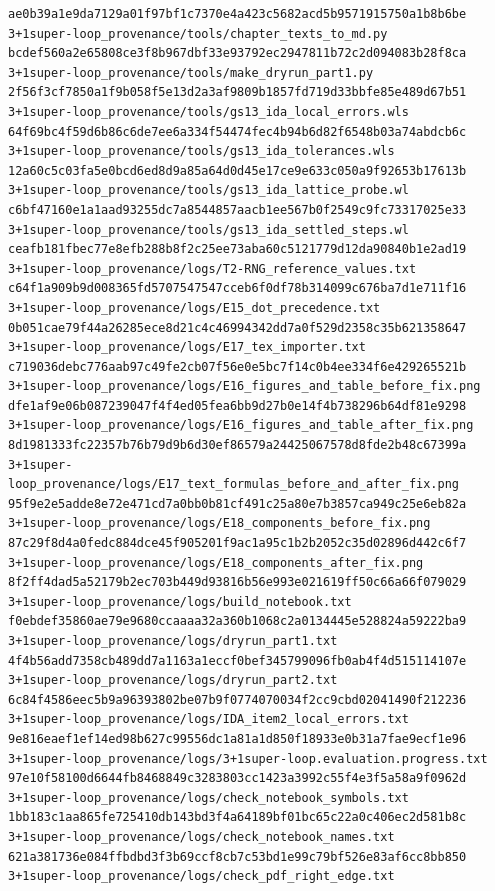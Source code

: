 \documentclass[
  10pt,
]{article}
\begin{document}
\begin{verbatim}
ae0b39a1e9da7129a01f97bf1c7370e4a423c5682acd5b9571915750a1b8b6be  3+1super-loop_provenance/tools/chapter_texts_to_md.py
bcdef560a2e65808ce3f8b967dbf33e93792ec2947811b72c2d094083b28f8ca  3+1super-loop_provenance/tools/make_dryrun_part1.py
2f56f3cf7850a1f9b058f5e13d2a3af9809b1857fd719d33bbfe85e489d67b51  3+1super-loop_provenance/tools/gs13_ida_local_errors.wls
64f69bc4f59d6b86c6de7ee6a334f54474fec4b94b6d82f6548b03a74abdcb6c  3+1super-loop_provenance/tools/gs13_ida_tolerances.wls
12a60c5c03fa5e0bcd6ed8d9a85a64d0d45e17ce9e633c050a9f92653b17613b  3+1super-loop_provenance/tools/gs13_ida_lattice_probe.wl
c6bf47160e1a1aad93255dc7a8544857aacb1ee567b0f2549c9fc73317025e33  3+1super-loop_provenance/tools/gs13_ida_settled_steps.wl
ceafb181fbec77e8efb288b8f2c25ee73aba60c5121779d12da90840b1e2ad19  3+1super-loop_provenance/logs/T2-RNG_reference_values.txt
c64f1a909b9d008365fd5707547547cceb6f0df78b314099c676ba7d1e711f16  3+1super-loop_provenance/logs/E15_dot_precedence.txt
0b051cae79f44a26285ece8d21c4c46994342dd7a0f529d2358c35b621358647  3+1super-loop_provenance/logs/E17_tex_importer.txt
c719036debc776aab97c49fe2cb07f56e0e5bc7f14c0b4ee334f6e429265521b  3+1super-loop_provenance/logs/E16_figures_and_table_before_fix.png
dfe1af9e06b087239047f4f4ed05fea6bb9d27b0e14f4b738296b64df81e9298  3+1super-loop_provenance/logs/E16_figures_and_table_after_fix.png
8d1981333fc22357b76b79d9b6d30ef86579a24425067578d8fde2b48c67399a  3+1super-loop_provenance/logs/E17_text_formulas_before_and_after_fix.png
95f9e2e5adde8e72e471cd7a0bb0b81cf491c25a80e7b3857ca949c25e6eb82a  3+1super-loop_provenance/logs/E18_components_before_fix.png
87c29f8d4a0fedc884dce45f905201f9ac1a95c1b2b2052c35d02896d442c6f7  3+1super-loop_provenance/logs/E18_components_after_fix.png
8f2ff4dad5a52179b2ec703b449d93816b56e993e021619ff50c66a66f079029  3+1super-loop_provenance/logs/build_notebook.txt
f0ebdef35860ae79e9680ccaaaa32a360b1068c2a0134445e528824a59222ba9  3+1super-loop_provenance/logs/dryrun_part1.txt
4f4b56add7358cb489dd7a1163a1eccf0bef345799096fb0ab4f4d515114107e  3+1super-loop_provenance/logs/dryrun_part2.txt
6c84f4586eec5b9a96393802be07b9f0774070034f2cc9cbd02041490f212236  3+1super-loop_provenance/logs/IDA_item2_local_errors.txt
9e816eaef1ef14ed98b627c99556dc1a81a1d850f18933e0b31a7fae9ecf1e96  3+1super-loop_provenance/logs/3+1super-loop.evaluation.progress.txt
97e10f58100d6644fb8468849c3283803cc1423a3992c55f4e3f5a58a9f0962d  3+1super-loop_provenance/logs/check_notebook_symbols.txt
1bb183c1aa865fe725410db143bd3f4a64189bf01bc65c22a0c406ec2d581b8c  3+1super-loop_provenance/logs/check_notebook_names.txt
621a381736e084ffbdbd3f3b69ccf8cb7c53bd1e99c79bf526e83af6cc8bb850  3+1super-loop_provenance/logs/check_pdf_right_edge.txt

\end{verbatim}
\end{document}
